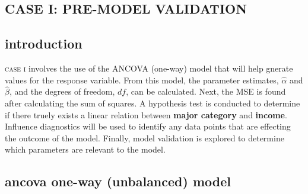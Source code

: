 \documentclass[10pt, twoside, openleft]{article}
\newcommand{\alphahat}{\hat{\alpha}} %
\newcommand{\betahat}{\hat{\beta}} %
\begin{document}
\begin{center}
\section{CASE I: PRE-MODEL VALIDATION}
\vspace{-5ex}
\end{center}

\begin{center}
\subsection{introduction}
\vspace{-3ex}
\end{center}

\noindent
\textsc{case i} involves the use of the ANCOVA (one-way) model that will help
gnerate values for the response variable. From this model, the parameter estimates,
$\alphahat$ and $\betahat$, and the degrees of freedom, $df$, can be calculated.
Next, the MSE is found after calculating the sum of squares. A hypothesis test is
conducted to determine if there truely exists a linear relation between
\textbf{major category} and \textbf{income}. Influence diagnostics will be used to
identify any data points that are effecting the outcome of the model. Finally, model
validation is explored to determine which parameters are relevant to the model.
\smallskip

\begin{center}
\subsection{ancova one-way (unbalanced) model}
\vspace{-3ex}
\end{center}
\end{document}
